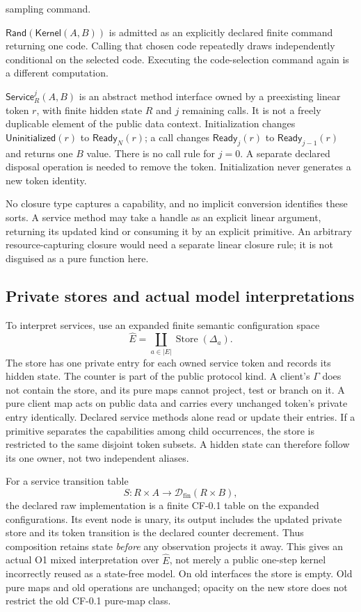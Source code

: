 \documentclass[11pt,a4paper]{article}
\theoremstyle{definition}
\newcommand{\Kernel}{\mathsf{Kernel}}
\newcommand{\Rand}{\mathsf{Rand}}
\newcommand{\Service}{\mathsf{Service}}
\newcommand{\Store}{\operatorname{Store}}
\begin{document}
\begin{description}
sampling command.
\item[Random kernels.] $\Rand(\Kernel(A,B))$ is admitted as an explicitly
declared finite command returning one code. Calling that chosen code
repeatedly draws independently conditional on the selected code.
Executing the code-selection command again is a different computation.
\item[Services.] $\Service^j_R(A,B)$ is an abstract method interface owned
by a preexisting linear token $r$, with finite hidden state $R$ and $j$
remaining calls. It is not a freely duplicable element of the public data
context. Initialization changes $\mathsf{Uninitialized}(r)$ to
$\mathsf{Ready}_N(r)$; a call changes $\mathsf{Ready}_j(r)$ to
$\mathsf{Ready}_{j-1}(r)$ and returns one $B$ value. There is no call rule
for $j=0$. A separate declared disposal operation is needed to remove the
token. Initialization never generates a new token identity.
\end{description}
No closure type captures a capability, and no implicit conversion identifies
these sorts. A service method may take a handle as an explicit linear
argument, returning its updated kind or consuming it by an explicit
primitive. An arbitrary resource-capturing closure would need a separate
linear closure rule; it is not disguised as a pure function here.

\subsection{Private stores and actual model interpretations}\label{sec:stores}
To interpret services, use an expanded finite semantic configuration space
\[
 \widehat E=\coprod_{a\in|E|}\Store(\Delta_a).
\]
The store has one private entry for each owned service token and records
its hidden state. The counter is part of the public protocol kind. A
client's $\Gamma$ does not contain the store, and its pure maps cannot
project, test or branch on it. A pure client map acts on public data and
carries every unchanged token's private entry identically. Declared service
methods alone read or update their entries. If a primitive separates the
capabilities among child occurrences, the store is restricted to the
same disjoint token subsets. A hidden state can therefore follow its one
owner, not two independent aliases.

For a service transition table
\[
 S:R\times A\longrightarrow\mathcal D_{\mathrm{fin}}(R\times B),
\]
the declared raw implementation is a finite CF-0.1 table on the expanded
configurations. Its event node is unary, its output includes the updated
private store and its token transition is the declared counter decrement.
Thus composition retains state \emph{before} any observation projects it
away. This gives an actual O1 mixed interpretation over $\widehat E$, not
merely a public one-step kernel incorrectly reused as a state-free model.
On old interfaces the store is empty. Old pure maps and old operations
are unchanged; opacity on the new store does not restrict the old
CF-0.1 pure-map class.
\end{document}
